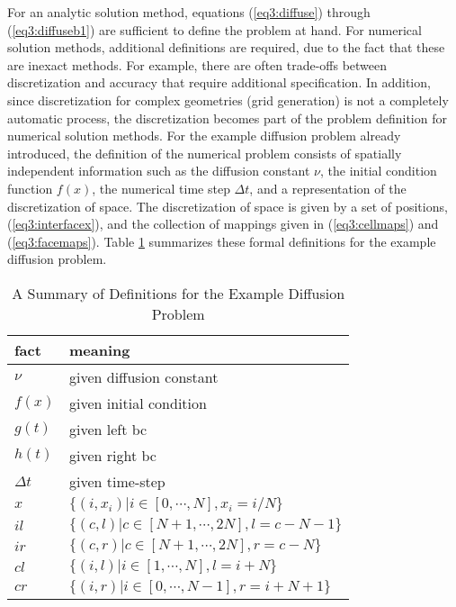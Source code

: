 \documentclass[10pt,epsf,letterpaper,twoside]{book}
\begin{document}
For an analytic solution method, equations (\ref{eq3:diffuse}) through
(\ref{eq3:diffuseb1}) are sufficient to define the problem at hand.
For numerical solution methods, additional definitions are required,
due to the fact that these are inexact methods.  For example, there
are often trade-offs between discretization and accuracy that require
additional specification.  In addition, since discretization for
complex geometries (grid generation) is not a completely automatic
process, the discretization becomes part of the problem definition for
numerical solution methods.  For the example diffusion problem already
introduced, the definition of the numerical problem consists of
spatially independent information such as the diffusion constant
$\nu$, the initial condition function $f(x)$, the numerical time step
$\Delta t$, and a representation of the discretization of space.  The
discretization of space is given by a set of positions,
(\ref{eq3:interfacex}), and the collection of mappings given in
(\ref{eq3:cellmaps}) and (\ref{eq3:facemaps}).  Table
\ref{table3:facts} summarizes these formal definitions for the example
diffusion problem.


\begin{table}[htbp]
\caption{ A Summary of Definitions for the Example Diffusion
  Problem}
\label{table3:facts}
\begin{center}
  \begin{tabular}{|l|l|}
    \hline
    fact      & meaning \\
    \hline
    $\nu$     & given diffusion constant  \\
    $f(x)$     & given initial condition  \\
    $g(t)$     & given left bc \\
    $h(t)$     & given right bc  \\
    $\Delta t$& given time-step  \\
    $x$       & $\lbrace (i,x_i) | i \in [0, \cdots, N], x_i = i/N    \rbrace$\\
    $il$      & $\lbrace (c,l)   | c \in [N+1, \cdots, 2N], l = c-N-1 \rbrace$\\
    $ir$      & $\lbrace (c,r)   | c \in [N+1, \cdots, 2N], r = c-N   \rbrace$\\
    $cl$      & $\lbrace (i,l)   | i \in [1, \cdots, N], l = i+N      \rbrace$\\
    $cr$      & $\lbrace (i,r)   | i \in [0, \cdots, N-1], r = i+N+1  \rbrace$\\
    \hline
  \end{tabular}
\end{center}
\end{table}
\end{document}
